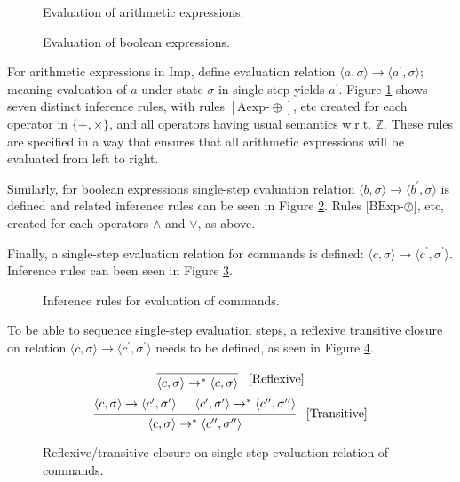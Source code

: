\begin{figure}[htb]

\caption{Evaluation of arithmetic expressions.}
\label{infer-arith}
\end{figure}
\begin{figure}[htb]

\caption{Evaluation of boolean expressions.}
\label{infer-bool}
\end{figure}

For arithmetic expressions in Imp, define evaluation relation $\langle a, \sigma \rangle \rightarrow \langle a^\prime, \sigma  \rangle$; meaning evaluation of $a$ under state $\sigma$ in single step yields $a^\prime$. Figure \ref{infer-arith} shows seven distinct inference rules, with rules $[\text{Aexp-}\oplus]$, etc created for each operator in $\{+, \times \}$, and all operators having usual semantics w.r.t. $\mathbb{Z}$. These rules are specified in a way that ensures that all arithmetic expressions will be evaluated from left to right.


Similarly, for boolean expressions single-step evaluation relation $\langle b, \sigma \rangle \rightarrow \langle b^\prime, \sigma  \rangle$ is defined and related inference rules can be seen in Figure \ref{infer-bool}. Rules [$\text{BExp-}\oslash]$, etc, created for each operators $\land$ and $\lor$, as above.

Finally, a single-step evaluation relation for commands is defined: $\langle c, \sigma \rangle \rightarrow \langle c^\prime, \sigma^\prime \rangle$. Inference rules can been seen in Figure \ref{infer-comm}.

\begin{figure}[htb]

\caption{Inference rules for evaluation of commands.}
\label{infer-comm}
\end{figure}

To be able to sequence single-step evaluation steps, a reflexive transitive closure on relation $\langle c, \sigma \rangle \rightarrow \langle c^\prime, \sigma^\prime \rangle$ needs to be defined, as seen in Figure \ref{transitive-closure}.

\begin{figure}[htb]
\[
\begin{prooftree}
\infer0{
	\langle c, \sigma \rangle 
	\rightarrow^{*} \langle 
	c, \sigma \rangle
}
\end{prooftree} \; \; \; [\text{Reflexive}]
\]
\[
\begin{prooftree}
\hypo{
	\langle c, \sigma \rangle \rightarrow \langle c^\prime, \sigma^\prime \rangle
} 
\hypo{
	\langle c^\prime, \sigma^\prime \rangle \rightarrow^{*} \langle c^{\prime\prime}, \sigma^{\prime\prime} \rangle
}
\infer2{
	\langle c, \sigma \rangle \rightarrow^{*} \langle c^{\prime\prime}, \sigma^{\prime\prime} \rangle
}
\end{prooftree} \; \; \; [\text{Transitive}]
\]
\caption{Reflexive/transitive closure on single-step evaluation relation of commands.}
\label{transitive-closure}
\end{figure}



